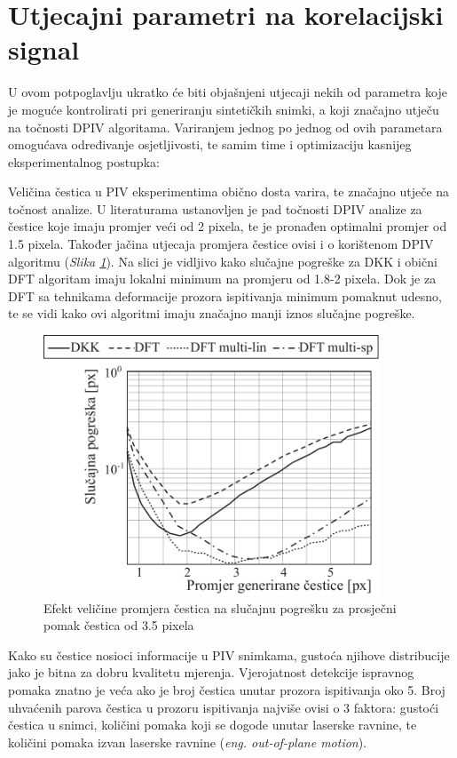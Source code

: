 \section{Utjecajni parametri na korelacijski signal}
U ovom potpoglavlju ukratko će biti objašnjeni utjecaji nekih od parametra koje je moguće kontrolirati pri generiranju sintetičkih snimki, a koji značajno utječu na točnosti DPIV algoritama. Variranjem jednog po jednog od ovih parametara omogućava određivanje osjetljivosti, te samim time i optimizaciju kasnijeg eksperimentalnog postupka:
\begin{description}[style=unboxed,leftmargin=0cm]
	\item[Promjer čestica markera] Veličina čestica u PIV eksperimentima obično dosta varira, te značajno utječe na točnost analize. U literaturama \cite{guezennec1990statistical} ustanovljen je pad točnosti DPIV analize za čestice koje imaju promjer veći od 2 pixela, te je pronađen optimalni promjer od 1.5 pixela\cite{raffel2018_book}. Također jačina utjecaja promjera čestice ovisi i o korištenom DPIV algoritmu (\textit{Slika \ref{sl:4.7}}). Na slici je vidljivo kako slučajne pogreške za DKK i obični DFT algoritam imaju lokalni minimum na promjeru od 1.8-2 pixela. Dok je za DFT sa tehnikama deformacije prozora ispitivanja minimum pomaknut udesno, te se vidi kako ovi algoritmi imaju značajno manji iznos slučajne pogreške.
	\begin{figure}[H]  
		\centering
		\includegraphics[width=10cm]{./4_PIVNesigurnost/slika4_7.pdf} 
		\caption{Efekt veličine promjera čestica na slučajnu pogrešku za prosječni pomak čestica od 3.5 pixela \cite{thielicke2014_article}}
		\label{sl:4.7}
	\end{figure}
	\item[Gustoća distribucije čestica] Kako su čestice nosioci informacije u PIV snimkama, gustoća njihove distribucije jako je bitna za dobru kvalitetu mjerenja. Vjerojatnost detekcije ispravnog pomaka znatno je veća ako je broj čestica unutar prozora ispitivanja oko 5. Broj uhvaćenih parova čestica u prozoru ispitivanja najviše ovisi o 3 faktora: gustoći čestica u snimci, količini pomaka koji se dogode unutar laserske ravnine, te količini pomaka izvan laserske ravnine (\textit{eng. out-of-plane motion}). 

\end{description}
